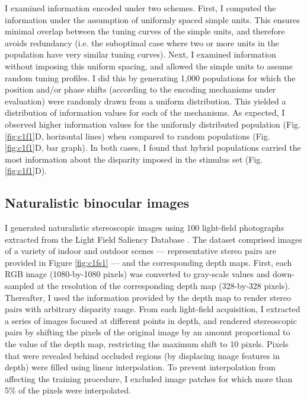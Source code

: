 I examined information encoded under two schemes. First, I computed the information under the assumption of uniformly spaced simple units. This ensures minimal overlap between the tuning curves of the simple units, and therefore avoids redundancy (i.e. the suboptimal case where two or more units in the population have very similar tuning curves). Next, I examined information without imposing this uniform spacing, and allowed the simple units to assume random tuning profiles. I did this by generating 1,000 populations for which the position and/or phase shifts (according to the encoding mechanisms under evaluation) were randomly drawn from a uniform distribution. This yielded a distribution of information values for each of the mechanisms. As expected, I observed higher information values for the uniformly distributed population (Fig. \ref{fig:c1f1}D, horizontal lines) when compared to random populations (Fig. \ref{fig:c1f1}D, bar graph). In both cases, I found that hybrid populations carried the most information about the disparity imposed in the stimulus set (Fig. \ref{fig:c1f1}D).

\subsection*{Naturalistic binocular images}

I generated naturalistic stereoscopic images using 100 light-field photographs extracted from the Light Field Saliency Database \cite{Li:2014ik}. The dataset comprised images of a variety of indoor and outdoor scenes --- representative stereo pairs are provided in Figure \ref{fig:c1fs1} --- and the corresponding depth maps. First, each RGB image (1080-by-1080 pixels) was converted to gray-scale values and down-sampled at the resolution of the corresponding depth map (328-by-328 pixels). Thereafter, I used the information provided by the depth map to render stereo pairs with arbitrary disparity range. From each light-field acquisition, I extracted a series of images focused at different points in depth, and rendered stereoscopic pairs by shifting the pixels of the original image by an amount proportional to the value of the depth map, restricting the maximum shift to 10 pixels. Pixels that were revealed behind occluded regions (by displacing image features in depth) were filled using linear interpolation. To prevent interpolation from affecting the training procedure, I excluded image patches for which more than 5\% of the pixels were interpolated. 

